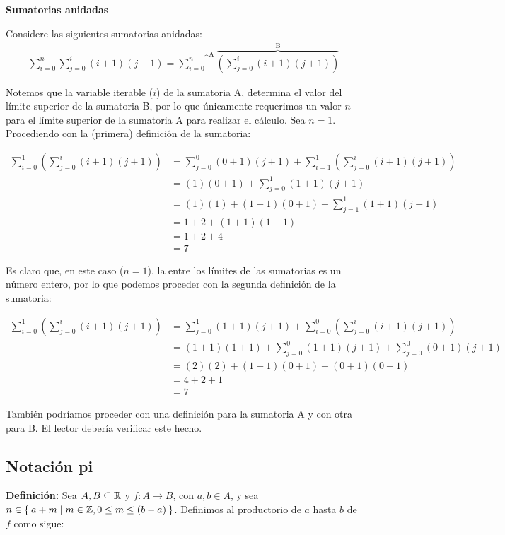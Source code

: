 \textbf{Sumatorias anidadas}

Considere las siguientes sumatorias anidadas:
\begin{align*}
  \sum_{i=0}^{n} \sum_{j=0}^{i} (i+1)(j+1) = \overbrace{\sum_{i=0}^{n}}^{\text{A}} \overbrace{\left(\sum_{j=0}^{i} (i+1)(j+1)\right)}^{\text{B}}
\end{align*}

Notemos que la variable iterable ($i$) de la sumatoria A, determina el valor del límite superior de la sumatoria B, por lo que únicamente requerimos un valor $n$ para el límite superior de la sumatoria A para realizar el cálculo. Sea $n=1$. Procediendo con la (primera) definición de la sumatoria:

\begin{align*}
  \sum_{i=0}^{1} \left(\sum_{j=0}^{i}(i+1)(j+1)\right) &= \sum_{j=0}^{0} (0+1)(j+1) + \sum_{i=1}^{1} \left(\sum_{j=0}^{i}(i+1)(j+1)\right) \\
  &= (1)(0+1) + \sum_{j=0}^{1} (1+1) (j+1)\\
  &= (1)(1) + (1+1)(0+1) + \sum_{j=1}^{1} (1+1) (j+1)\\
  &= 1 + 2 + (1+1)(1+1)\\
  &= 1 + 2 + 4\\
  &= 7
\end{align*}

Es claro que, en este caso ($n=1$), la  entre los límites de las sumatorias es un número entero, por lo que podemos proceder con la segunda definición de la sumatoria:

\begin{align*}
  \sum_{i=0}^{1} \left(\sum_{j=0}^{i}(i+1)(j+1)\right) &= \sum_{j=0}^{1} (1+1) (j+1) + \sum_{i=0}^{0} \left(\sum_{j=0}^{i}(i+1)(j+1)\right)\\
  &= (1+1)(1+1) + \sum_{j=0}^{0} (1+1) (j+1) + \sum_{j=0}^{0} (0+1)(j+1)\\
  &= (2)(2) + (1+1)(0+1) + (0+1)(0+1)\\
  &= 4 + 2 + 1\\
  &= 7
\end{align*}

También podríamos proceder con una definición para la sumatoria A y con otra para B. El lector debería verificar este hecho.

\subsection*{Notación pi}

\textbf{Definición:} Sea $A, B\subseteq \mathbb{R}$ y $f:A \to B$, con $a,b\in A$, y sea $n \in \Set{a + m | m\in \mathbb{Z}, 0\leq m \leq (b-a)}$. Definimos al productorio de $a$ hasta $b$ de $f$ como sigue:

